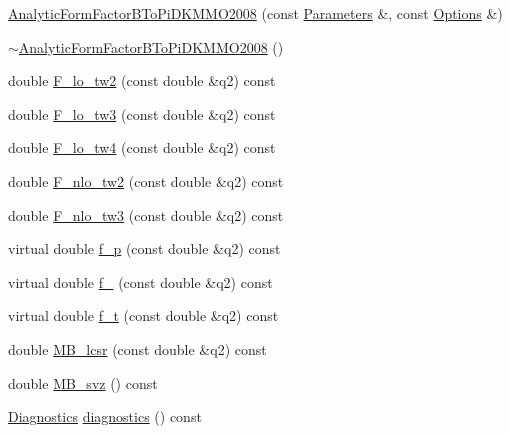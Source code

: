 \begin{DoxyCompactItemize}
\item 
\hyperlink{classeos_1_1AnalyticFormFactorBToPiDKMMO2008_aee4ce0fc9eb6b6dbb95ccb80b59c0aa3}{AnalyticFormFactorBToPiDKMMO2008} (const \hyperlink{classeos_1_1Parameters}{Parameters} \&, const \hyperlink{classeos_1_1Options}{Options} \&)
\item 
\hyperlink{classeos_1_1AnalyticFormFactorBToPiDKMMO2008_afdb28ecd4ce74296cb8b4e99af7819dd}{$\sim$AnalyticFormFactorBToPiDKMMO2008} ()
\item 
double \hyperlink{classeos_1_1AnalyticFormFactorBToPiDKMMO2008_a8eff8336c192970590daafaad2e1ae0d}{F\_\-lo\_\-tw2} (const double \&q2) const 
\item 
double \hyperlink{classeos_1_1AnalyticFormFactorBToPiDKMMO2008_ae19b96e05460dcb94c6382a49bc009a4}{F\_\-lo\_\-tw3} (const double \&q2) const 
\item 
double \hyperlink{classeos_1_1AnalyticFormFactorBToPiDKMMO2008_a1a9ca014971d5c140df4fc3c9bf03879}{F\_\-lo\_\-tw4} (const double \&q2) const 
\item 
double \hyperlink{classeos_1_1AnalyticFormFactorBToPiDKMMO2008_abb2691fe8415e5c5c4db53af3ef4ba41}{F\_\-nlo\_\-tw2} (const double \&q2) const 
\item 
double \hyperlink{classeos_1_1AnalyticFormFactorBToPiDKMMO2008_a8d4a9d28a81a8b60d557162f0e3a0c5a}{F\_\-nlo\_\-tw3} (const double \&q2) const 
\item 
virtual double \hyperlink{classeos_1_1AnalyticFormFactorBToPiDKMMO2008_acc3cbe21d5bab4ee23a457b757749bbf}{f\_\-p} (const double \&q2) const 
\item 
virtual double \hyperlink{classeos_1_1AnalyticFormFactorBToPiDKMMO2008_a646f3764614e79700d31571b9df620ba}{f\_} (const double \&q2) const 
\item 
virtual double \hyperlink{classeos_1_1AnalyticFormFactorBToPiDKMMO2008_aa3903289904f6e732bc9094f3826d3be}{f\_\-t} (const double \&q2) const 
\item 
double \hyperlink{classeos_1_1AnalyticFormFactorBToPiDKMMO2008_abc228c8f704b43ac2c777ab48d22c08c}{MB\_\-lcsr} (const double \&q2) const 
\item 
double \hyperlink{classeos_1_1AnalyticFormFactorBToPiDKMMO2008_a813b78c9a4e5ea82d7f77154e7dffa63}{MB\_\-svz} () const 
\item 
\hyperlink{classeos_1_1Diagnostics}{Diagnostics} \hyperlink{classeos_1_1AnalyticFormFactorBToPiDKMMO2008_a4996873565e4da45f132cbfdd90f7617}{diagnostics} () const 
\end{DoxyCompactItemize}
